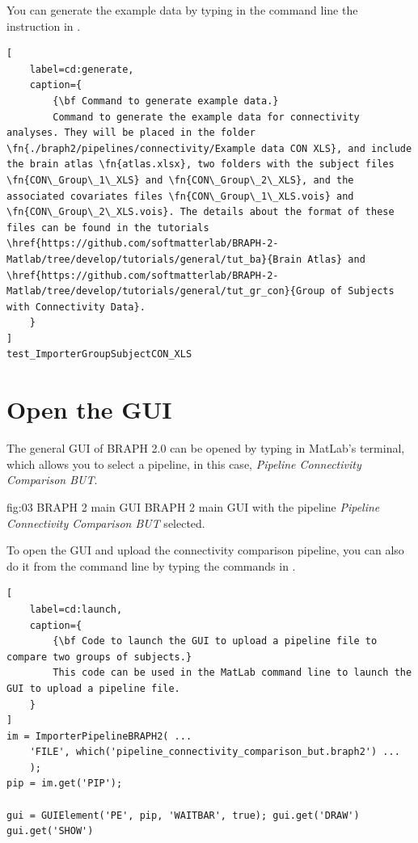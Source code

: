 \documentclass[justified]{tufte-handout}
\begin{document}
You can generate the example data by typing in the command line the instruction in .
%
\begin{lstlisting}[
	label=cd:generate,
	caption={
		{\bf Command to generate example data.}
		Command to generate the example data for connectivity analyses. They will be placed in the folder \fn{./braph2/pipelines/connectivity/Example data CON XLS}, and include the brain atlas \fn{atlas.xlsx}, two folders with the subject files \fn{CON\_Group\_1\_XLS} and \fn{CON\_Group\_2\_XLS}, and the associated covariates files \fn{CON\_Group\_1\_XLS.vois} and \fn{CON\_Group\_2\_XLS.vois}. The details about the format of these files can be found in the tutorials \href{https://github.com/softmatterlab/BRAPH-2-Matlab/tree/develop/tutorials/general/tut_ba}{Brain Atlas} and \href{https://github.com/softmatterlab/BRAPH-2-Matlab/tree/develop/tutorials/general/tut_gr_con}{Group of Subjects with Connectivity Data}.
	}
]
test_ImporterGroupSubjectCON_XLS
\end{lstlisting}

\section{Open the GUI}

The general GUI of BRAPH 2.0 can be opened by typing  in MatLab's terminal, which allows you to select a pipeline, in this case, \emph{Pipeline Connectivity Comparison BUT}.

	{fig:03}
	{
	}
	{BRAPH 2 main GUI}
	{
	BRAPH 2 main GUI with the pipeline \emph{Pipeline Connectivity Comparison BUT} selected.
	}

\begin{tcolorbox}[
	title=Pipeline launch from command line
]
To open the GUI and upload the connectivity comparison pipeline, you can also do it from the command line by typing the commands in .
%
\begin{lstlisting}[
	label=cd:launch,
	caption={
		{\bf Code to launch the GUI to upload a pipeline file to compare two groups of subjects.}
		This code can be used in the MatLab command line to launch the GUI to upload a pipeline file.
	}
]
im = ImporterPipelineBRAPH2( ...
	'FILE', which('pipeline_connectivity_comparison_but.braph2') ...
	);
pip = im.get('PIP');

gui = GUIElement('PE', pip, 'WAITBAR', true); gui.get('DRAW')
gui.get('SHOW')
\end{lstlisting}
\end{tcolorbox}
\end{document}
